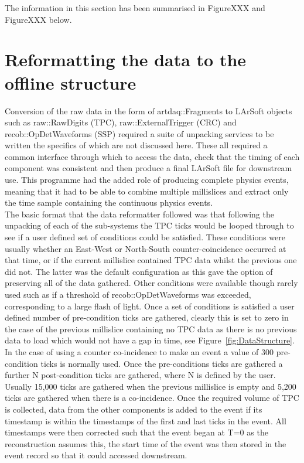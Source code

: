 The information in this section has been summarised in FigureXXX and FigureXXX below.

\section{Reformatting the data to the offline structure} \label{Reformatting the data to the offline structure} %
Conversion of the raw data in the form of artdaq::Fragments to LArSoft objects such as raw::RawDigits (TPC), raw::ExternalTrigger (CRC) and recob::OpDetWaveforms (SSP) required a suite of unpacking services to be written the specifics of which are not discussed here. These all required a common interface through which to access the data, check that the timing of each component was consistent and then produce a final LArSoft file for downstream use. This programme had the added role of producing complete physics events, meaning that it had to be able to combine multiple millislices and extract only the time sample containing the continuous physics events. \\

The basic format that the data reformatter followed was that following the unpacking of each of the sub-systems the TPC ticks would be looped through to see if a user defined set of conditions could be satisfied. These conditions were usually whether an East-West or North-South counter-coincidence occurred at that time, or if the current millislice contained TPC data whilst the previous one did not. The latter was the default configuration as this gave the option of preserving all of the data gathered. Other conditions were available though rarely used such as if a threshold of recob::OpDetWaveforms was exceeded, corresponding to a large flash of light. Once a set of conditions is satisfied a user defined number of pre-condition ticks are gathered, clearly this is set to zero in the case of the previous millislice containing no TPC data as there is no previous data to load which would not have a gap in time, see Figure~\ref{fig:DataStructure}. In the case of using a counter co-incidence to make an event a value of 300 pre-condition ticks is normally used. Once the pre-conditions ticks are gathered a further N post-condition ticks are gathered, where N is defined by the user. Usually 15,000 ticks are gathered when the previous millislice is empty and 5,200 ticks are gathered when there is a co-incidence. Once the required volume of TPC is collected, data from the other components is added to the event if its timestamp is within the timestamps of the first and last ticks in the event. All timestamps were then corrected such that the event began at T=0 as the reconstruction assumes this, the start time of the event was then stored in the event record so that it could accessed downstream. \\

